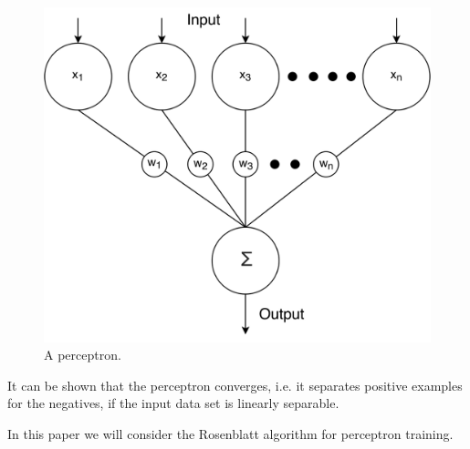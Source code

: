 \begin{figure}[H]
	\centering
	\includegraphics[width=\columnwidth]{./img/perceptron}
	\caption{A perceptron.}
	\label{fig:1:perceptron}
\end{figure}

It can be shown that the perceptron converges, i.e. it separates positive examples for the negatives, if the input data set is linearly separable. 

In this paper we will consider the Rosenblatt algorithm for perceptron training. 



